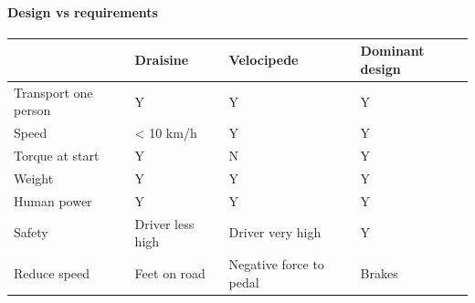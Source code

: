 \paragraph{Design vs requirements}
\begin{center}
\small
\begin{tabularx}{\linewidth}{X|XXX}
 & Draisine & Velocipede & Dominant design \\
\hline
Transport one person & Y & Y & Y \\
\hline
Speed & < 10 km/h & Y & Y \\
\hline
Torque at start & Y & N & Y \\
\hline
Weight & Y & Y & Y \\
\hline
Human power & Y & Y & Y \\
\hline
Safety & Driver less high & Driver very high & Y \\
\hline
Reduce speed & Feet on road & Negative force to pedal & Brakes \\
\end{tabularx}
\end{center}